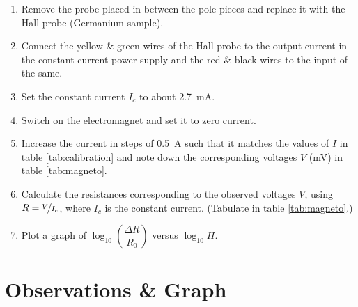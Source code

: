 \begin{enumerate}
	\item 	Remove the probe placed in between the pole pieces and replace it with the Hall probe (Germanium sample). 
	
	\item	Connect the yellow \& green wires of the Hall probe to the output current in the constant current power supply and the red \& black wires to the input of the same. 
	
	\item 	Set the constant current $ I_c $ to about \SI{2.7}{\milli\ampere}.
	
	\item 	Switch on the electromagnet and set it to zero current.
	
	\item 	Increase the current in steps of \SI{0.5}{\ampere} such that it matches the values of $ I $ in table \ref{tab:calibration} and note down the corresponding voltages $ V $ (\si{\milli\volt}) in table \ref{tab:magneto}.
	
	\item 	Calculate the resistances corresponding to the observed voltages $ V $, using $ R = \nicefrac{V}{I_c} $, where $ I_c $ is the constant current. (Tabulate in table \ref{tab:magneto}.)
	
	\item 	Plot a graph of $ \log_{10}\left(\dfrac{\Delta R}{R_0}\right) $ versus $ \log_{10} H $.
\end{enumerate}

\section{Observations \& Graph}

